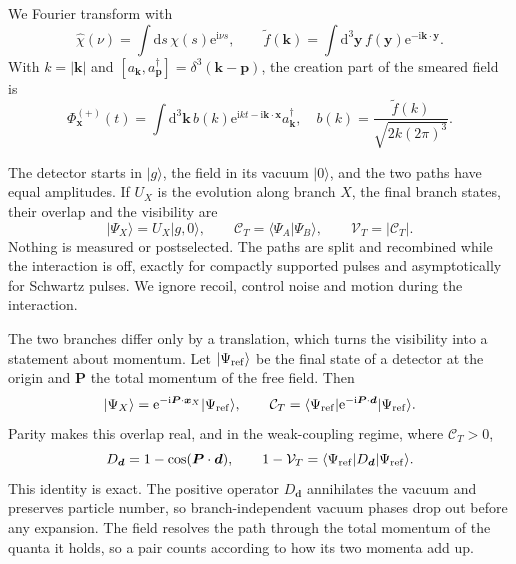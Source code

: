 \documentclass[11pt,a4paper]{article}
\newcommand{\dd}{\mathrm{d}}
\newcommand{\ii}{\mathrm{i}}
\newcommand{\ee}{\mathrm{e}}
\newcommand{\ket}[1]{\lvert #1\rangle}
\newcommand{\bra}[1]{\langle #1\rvert}
\newcommand{\cV}{\mathcal{V}}
\newcommand{\cC}{\mathcal{C}}
\begin{document}
We Fourier transform with
\begin{equation}
 \widehat\chi(\nu)=\int\dd s\,\chi(s)\ee^{\ii\nu s},
 \qquad \widetilde f(\bm k)=\int\dd^3\bm y\,f(\bm y)\ee^{-\ii\bm k\cdot\bm y}.
 \label{eq:fourier}
\end{equation}
With $k=|\bm k|$ and $[a_{\bm k},a_{\bm p}^{\dagger}]=\delta^3(\bm k-\bm p)$, the creation part of the smeared field is
\begin{equation}
 \Phi_{\bm x}^{(+)}(t)=\int\dd^3\bm k\,b(k)\ee^{\ii kt-\ii\bm k\cdot\bm x}a_{\bm k}^{\dagger},
 \quad b(k)=\frac{\widetilde f(k)}{\sqrt{2k(2\pi)^3}}.\label{eq:modes}
\end{equation}

The detector starts in $\ket g$, the field in its vacuum $\ket0$, and the two paths have equal amplitudes. If $U_X$ is the evolution along branch $X$, the final branch states, their overlap and the visibility are
\begin{equation}
 \ket{\Psi_X}=U_X\ket{g,0},\qquad
 \cC_T=\langle\Psi_A|\Psi_B\rangle,\qquad
 \cV_T=|\cC_T|.\label{eq:visibility}
\end{equation}
Nothing is measured or postselected. The paths are split and recombined while the interaction is off, exactly for compactly supported pulses and asymptotically for Schwartz pulses. We ignore recoil, control noise and motion during the interaction.

The two branches differ only by a translation, which turns the visibility into a statement about momentum. Let $\ket{\Psi_{\rm ref}}$ be the final state of a detector at the origin and $\bm P$ the total momentum of the free field. Then
\begin{equation}
 \ket{\Psi_X}=\ee^{-\ii\bm P\cdot\bm x_X}\ket{\Psi_{\rm ref}},
 \qquad
 \cC_T=\bra{\Psi_{\rm ref}}\ee^{-\ii\bm P\cdot\bm d}\ket{\Psi_{\rm ref}}.
 \label{eq:translation}
\end{equation}
Parity makes this overlap real, and in the weak-coupling regime, where $\cC_T>0$,
\begin{equation}
 D_{\bm d}=1-\cos(\bm P\cdot\bm d),\qquad
 1-\cV_T=\bra{\Psi_{\rm ref}}D_{\bm d}\ket{\Psi_{\rm ref}}.
 \label{eq:momentum}
\end{equation}
This identity is exact. The positive operator $D_{\bm d}$ annihilates the vacuum and preserves particle number, so branch-independent vacuum phases drop out before any expansion. The field resolves the path through the total momentum of the quanta it holds, so a pair counts according to how its two momenta add up.
\end{document}

